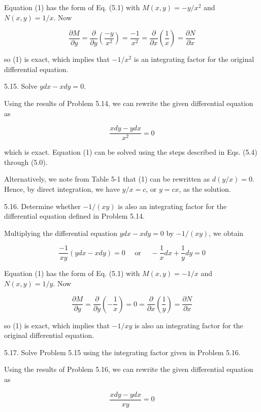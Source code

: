 \documentclass[10pt]{article}
\begin{document}
Equation (1) has the form of Eq. (5.1) with $M(x, y)=-y / x^{2}$ and $N(x, y)=1 / x$. Now

$$
\frac{\partial M}{\partial y}=\frac{\partial}{\partial y}\left(\frac{-y}{x^{2}}\right)=\frac{-1}{x^{2}}=\frac{\partial}{\partial x}\left(\frac{1}{x}\right)=\frac{\partial N}{\partial x}
$$

so (1) is exact, which implies that $-1 / x^{2}$ is an integrating factor for the original differential equation.

5.15. Solve $y d x-x d y=0$.

Using the results of Problem 5.14, we can rewrite the given differential equation as

$$
\frac{x d y-y d x}{x^{2}}=0
$$

which is exact. Equation (1) can be solved using the steps described in Eqs. (5.4) through (5.0).

Alternatively, we note from Table 5-1 that (1) can be rewritten as $d(y / x)=0$. Hence, by direct integration, we have $y / x=c$, or $y=c x$, as the solution.

5.16. Determine whether $-1 /(x y)$ is also an integrating factor for the differential equation defined in Problem 5.14.

Multiplying the differential equation $y d x-x d y=0$ by $-1 /(x y)$, we obtain


\begin{equation*}
\frac{-1}{x y}(y d x-x d y)=0 \quad \text { or } \quad-\frac{1}{x} d x+\frac{1}{y} d y=0 \tag{1}
\end{equation*}


Equation (1) has the form of Eq. (5.1) with $M(x, y)=-1 / x$ and $N(x, y)=1 / y$. Now

$$
\frac{\partial M}{\partial y}=\frac{\partial}{\partial y}\left(-\frac{1}{x}\right)=0=\frac{\partial}{\partial x}\left(\frac{1}{y}\right)=\frac{\partial N}{\partial x}
$$

so (1) is exact, which implies that $-1 / x y$ is also an integrating factor for the original differential equation.

5.17. Solve Problem 5.15 using the integrating factor given in Problem 5.16.

Using the results of Problem 5.16, we can rewrite the given differential equation as


\begin{equation*}
\frac{x d y-y d x}{x y}=0 \tag{1}
\end{equation*}
\end{document}
